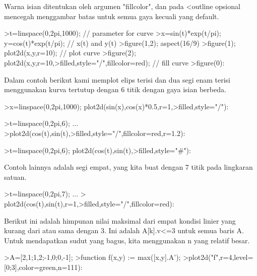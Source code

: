 \documentclass[a4paper,10pt]{article}
\begin{document}
\begin{eulernotebook}
\begin{eulercomment}
\begin{eulercomment}
\begin{eulercomment}
\begin{eulercomment}
\begin{eulercomment}
\begin{eulercomment}
\begin{eulercomment}
\begin{eulercomment}
\begin{eulercomment}
Warna isian ditentukan oleh argumen "fillcolor", dan pada \textless{}outline
opsional mencegah menggambar batas untuk semua gaya kecuali yang
default.
\end{eulercomment}
\begin{eulerprompt}
>t=linspace(0,2pi,1000); // parameter for curve
>x=sin(t)*exp(t/pi); y=cos(t)*exp(t/pi); // x(t) and y(t)
>figure(1,2); aspect(16/9)
>figure(1); plot2d(x,y,r=10); // plot curve
>figure(2); plot2d(x,y,r=10,>filled,style="/",fillcolor=red); // fill curve
>figure(0):
\end{eulerprompt}
\begin{eulercomment}
Dalam contoh berikut kami memplot elips terisi dan dua segi enam
terisi menggunakan kurva tertutup dengan 6 titik dengan gaya isian
berbeda.
\end{eulercomment}
\begin{eulerprompt}
>x=linspace(0,2pi,1000); plot2d(sin(x),cos(x)*0.5,r=1,>filled,style="/"):
\end{eulerprompt}
\begin{eulerprompt}
>t=linspace(0,2pi,6); ...
>plot2d(cos(t),sin(t),>filled,style="/",fillcolor=red,r=1.2):
\end{eulerprompt}
\begin{eulerprompt}
>t=linspace(0,2pi,6); plot2d(cos(t),sin(t),>filled,style="#"):
\end{eulerprompt}
\begin{eulercomment}
Contoh lainnya adalah segi empat, yang kita buat dengan 7 titik pada
lingkaran satuan.
\end{eulercomment}
\begin{eulerprompt}
>t=linspace(0,2pi,7);  ...
> plot2d(cos(t),sin(t),r=1,>filled,style="/",fillcolor=red):
\end{eulerprompt}
\begin{eulercomment}
Berikut ini adalah himpunan nilai maksimal dari empat kondisi linier
yang kurang dari atau sama dengan 3. Ini adalah A[k].v\textless{}=3 untuk semua
baris A. Untuk mendapatkan sudut yang bagus, kita menggunakan n yang
relatif besar.
\end{eulercomment}
\begin{eulerprompt}
>A=[2,1;1,2;-1,0;0,-1];
>function f(x,y) := max([x,y].A');
>plot2d("f",r=4,level=[0;3],color=green,n=111):

\end{eulerprompt}
\end{eulercomment}
\end{eulercomment}
\end{eulercomment}
\end{eulercomment}
\end{eulercomment}
\end{eulercomment}
\end{eulercomment}
\end{eulercomment}
\end{eulernotebook}
\end{document}
